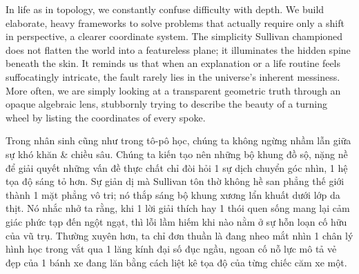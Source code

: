 \documentclass[11pt]{article}
\begin{document}
\begin{center}
\end{center}

In life as in topology, we constantly confuse difficulty with depth. We build elaborate, heavy frameworks to solve problems that actually require only a shift in perspective, a clearer coordinate system. The simplicity Sullivan championed does not flatten the world into a featureless plane; it illuminates the hidden spine beneath the skin. It reminds us that when an explanation or a life routine feels suffocatingly intricate, the fault rarely lies in the universe's inherent messiness. More often, we are simply looking at a transparent geometric truth through an opaque algebraic lens, stubbornly trying to describe the beauty of a turning wheel by listing the coordinates of every spoke.

Trong nhân sinh cũng như trong tô-pô học, chúng ta không ngừng nhầm lẫn giữa sự khó khăn \& chiều sâu. Chúng ta kiến tạo nên những bộ khung đồ sộ, nặng nề để giải quyết những vấn đề thực chất chỉ đòi hỏi 1 sự dịch chuyển góc nhìn, 1 hệ tọa độ sáng tỏ hơn. Sự giản dị mà Sullivan tôn thờ không hề san phẳng thế giới thành 1 mặt phẳng vô tri; nó thắp sáng bộ khung xương lẩn khuất dưới lớp da thịt. Nó nhắc nhở ta rằng, khi 1 lời giải thích hay 1 thói quen sống mang lại cảm giác phức tạp đến ngột ngạt, thì lỗi lầm hiếm khi nào nằm ở sự hỗn loạn cố hữu của vũ trụ. Thường xuyên hơn, ta chỉ đơn thuần là đang nheo mắt nhìn 1 chân lý hình học trong vắt qua 1 lăng kính đại số đục ngầu, ngoan cố nỗ lực mô tả vẻ đẹp của 1 bánh xe đang lăn bằng cách liệt kê tọa độ của từng chiếc căm xe một.
\end{document}

